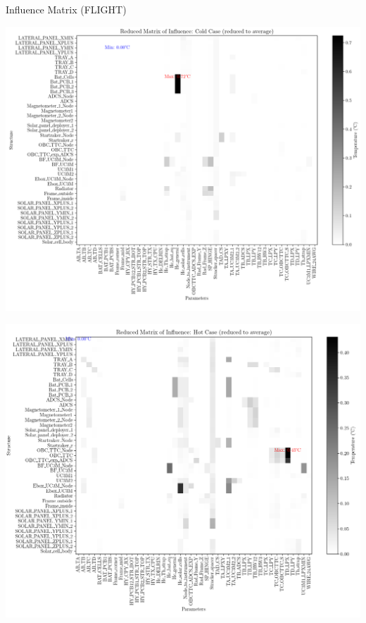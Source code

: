 \documentclass{cubeamer}
\begin{document}
\begin{frame}{Influence Matrix (FLIGHT)}
\begin{center}
    \begin{minipage}{0.475\textwidth}
    \includegraphics[width=1\linewidth]{Figures/Flight/infmatCC-F.png}
\end{minipage}
\begin{minipage}{0.475\textwidth}
    \includegraphics[width=1\linewidth]{Figures/Flight/infmatHC-F.png}
\end{minipage}
\end{center}

\end{frame}
\end{document}
